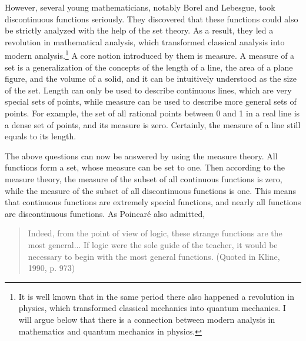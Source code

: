 \noindent However, several young mathematicians, notably Borel and Lebesgue, took discontinuous functions seriously. They discovered that these functions could also be strictly analyzed with the help of the set theory. As a result, they led a revolution in mathematical analysis, which transformed classical analysis into modern analysis.\footnote{It is well known that in the same period there also happened a revolution in physics, which transformed classical mechanics into quantum mechanics. I will argue below that there is a connection between modern analysis in mathematics and quantum mechanics in physics.}
A core notion introduced by them is measure.
A measure of a set is a generalization of the concepts of the length of a line, the area of a plane figure, and the volume of a solid, and it can be intuitively understood as the size of the set.
Length can only be used to describe continuous lines, which are very special sets of points, while measure can be used to describe more general sets of points.
For example, the set of all rational points between 0 and 1 in a real line is a dense set of points, and its measure is zero. Certainly, the measure of a line still equals to its length.

The above questions can now be answered by using the measure theory.
All functions form a set, whose measure can be set to one.
Then according to the measure theory, the measure of the subset of all continuous functions is zero, while the measure of the subset of all discontinuous functions is one. 
This means that continuous functions are extremely special functions, and nearly all functions are discontinuous functions. As Poincar\'{e} also admitted,

\begin{quote}
Indeed, from the point of view of logic, these strange functions are the most general... If logic were the sole guide of the teacher, it would be necessary to begin with the most general functions. (Quoted in Kline, 1990, p. 973)
\end{quote}

